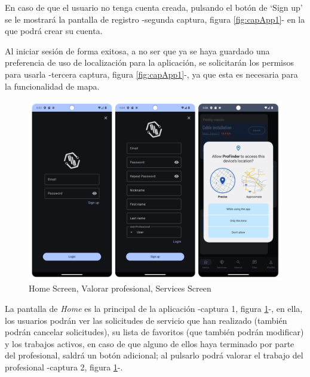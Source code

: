 En caso de que el usuario no tenga cuenta creada, pulsando el botón de ‘Sign up’ se le mostrará la pantalla de registro -segunda captura, figura \ref{fig:capApp1}- en la que podrá crear su cuenta.

Al iniciar sesión de forma exitosa, a no ser que ya se haya guardado una preferencia de uso de localización para la aplicación, se solicitarán los permisos para usarla -tercera captura, figura \ref{fig:capApp1}-, ya que esta es necesaria para la funcionalidad de mapa.
\newpage
\begin{figure}[h]
	\centering
	\includegraphics[width = 1\textwidth]{Imagenes/capturasApp/login_signup_local.png}
	\caption{Home Screen, Valorar profesional, Services Screen}
	\label{fig:capApp2}
\end{figure}

La pantalla de \textit{Home} es la principal de la aplicación -captura 1, figura \ref{fig:capApp2}-, en ella, los usuarios podrán ver las solicitudes de servicio que han realizado (también podrán cancelar solicitudes), su lista de favoritos (que también podrán modificar) y los trabajos activos, en caso de que alguno de ellos haya terminado por parte del profesional, saldrá un botón adicional; al pulsarlo podrá valorar el trabajo del profesional -captura 2, figura \ref{fig:capApp2}-.

